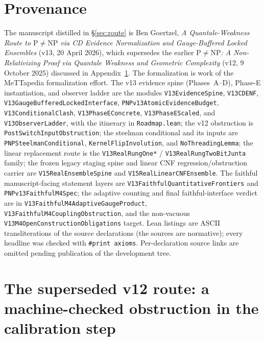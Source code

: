 \documentclass[11pt]{article}
\theoremstyle{definition}
\begin{document}
\section*{Provenance}
The manuscript distilled in \S\ref{sec:route} is Ben Goertzel, \emph{A
Quantale-Weakness Route to $\mathrm{P}\neq\mathrm{NP}$ via CD Evidence
Normalization and Gauge-Buffered Locked Ensembles} (v13, 20 April 2026), which
supersedes the earlier \emph{$\mathrm{P}\neq\mathrm{NP}$: A Non-Relativizing Proof
via Quantale Weakness and Geometric Complexity} (v12, 9 October 2025) discussed in
Appendix~\ref{app:v12}. The formalization is work of the MeTTapedia formalization
effort. The v13 evidence spine (Phases~A--D), Phase-E instantiation, and observer
ladder are the modules \texttt{V13EvidenceSpine}, \texttt{V13CDENF},
\texttt{V13GaugeBufferedLockedInterface}, \texttt{PNPv13AtomicEvidenceBudget},
\texttt{V13ConditionalClash}, \texttt{V13PhaseEConcrete},
\texttt{V13PhaseEScaled}, and \texttt{V13ObserverLadder}, with the itinerary in
\texttt{Roadmap.lean}; the v12 obstruction is \texttt{PostSwitchInputObstruction};
the steelman conditional and its inputs are \texttt{PNPSteelmanConditional},
\texttt{KernelFlipInvolution}, and \texttt{NoThreadingLemma}; the linear
replacement route is the \texttt{V13RealRungOne*} / \texttt{V13RealRungTwoBitJunta}
family; the frozen legacy staging spine and linear CNF regression/obstruction
carrier are \texttt{V15RealEnsembleSpine} and
\texttt{V15RealLinearCNFEnsemble}.  The faithful manuscript-facing statement layers
are \texttt{V13FaithfulQuantitativeFrontiers} and
\texttt{PNPv13FaithfulM4Spec}; the adaptive counting and final faithful-interface
verdict are in \texttt{V13FaithfulM4AdaptiveGaugeProduct},
\texttt{V13FaithfulM4CouplingObstruction}, and the non-vacuous
\texttt{V13M4OpenConstructionObligations} target. Lean listings
are ASCII transliterations of the source declarations
(the sources are normative); every headline was checked with \texttt{\#print
axioms}. Per-declaration source links are omitted pending publication of the
development tree.

\appendix

\section{The superseded v12 route: a machine-checked obstruction in the
calibration step}
\label{app:v12}
\end{document}

